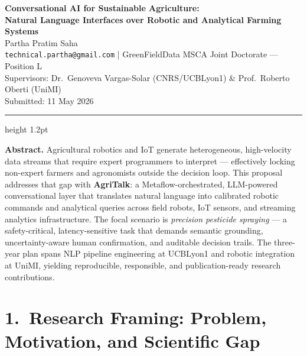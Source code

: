 \documentclass[11pt,a4paper]{article}
\begin{document}
\begin{center}
  {\LARGE\bfseries\color{techblue}
    Conversational AI for Sustainable Agriculture:\\[4pt]
    Natural Language Interfaces over Robotic and Analytical Farming Systems}\\[10pt]
  {\large Partha Pratim Saha}\\[2pt]
  {\normalsize
    \texttt{technical.partha@gmail.com}
    \quad|\quad
    GreenFieldData MSCA Joint Doctorate — Position L\\[2pt]
    Supervisors: Dr.\ Genoveva Vargas-Solar (CNRS/UCBLyon1) \& Prof.\ Roberto Oberti (UniMI)}\\[6pt]
  {\small Submitted: 11 May 2026}
\end{center}
\hrule height 1.2pt
\vspace{6pt}

\begin{mdframed}[backgroundcolor=gray!8, linewidth=0.5pt]
\textbf{Abstract.}
Agricultural robotics and IoT generate heterogeneous, high-velocity data streams that require expert
programmers to interpret — effectively locking non-expert farmers and agronomists outside the
decision loop. This proposal addresses that gap with \textbf{AgriTalk}: a Metaflow-orchestrated,
LLM-powered conversational layer that translates natural language into calibrated robotic commands
and analytical queries across field robots, IoT sensors, and streaming analytics infrastructure.
The focal scenario is \emph{precision pesticide spraying} — a safety-critical, latency-sensitive task that
demands semantic grounding, uncertainty-aware human confirmation, and auditable decision trails.
The three-year plan spans NLP pipeline engineering at UCBLyon1 and robotic integration at UniMI,
yielding reproducible, responsible, and publication-ready research contributions.
\end{mdframed}
\vspace{4pt}

\section{1.\ Research Framing: Problem, Motivation, and Scientific Gap}
\end{document}
